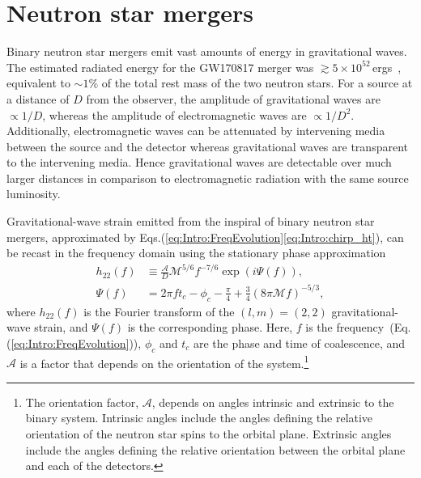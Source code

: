\documentclass[../Thesis.tex]{subfiles}
\begin{document}
    \section{Neutron star mergers} \label{sec:Intro:NeutronStarMergers}
    Binary neutron star mergers emit vast amounts of energy in gravitational waves.
    The estimated radiated energy for the GW170817 merger was $\gtrsim 5\times 10^{52}\,$ergs~\cite{GW170817Detection}, equivalent to $\sim 1\%$ of the total rest mass of the two neutron stars.
    For a source at a distance of $D$ from the observer, the amplitude of gravitational waves are  $\propto 1/D$, whereas the amplitude of electromagnetic waves are $\propto 1/D^2$.
    Additionally, electromagnetic waves can be attenuated by intervening media between the source and the detector whereas gravitational waves are transparent to the intervening media.
    Hence gravitational waves are detectable over much larger distances in comparison to electromagnetic radiation with the same source luminosity. \par
    Gravitational-wave strain emitted from the inspiral of binary neutron star mergers, approximated by Eqs.(\ref{eq:Intro:FreqEvolution}\Hyphdash*\ref{eq:Intro:chirp_ht}), can be recast in the frequency domain using the stationary phase approximation~\cite{Cutler1994}
    \begin{align}
        h_{22}(f) & \equiv \frac{\mathcal{A}}{D}\mathcal{M}^{5/6}f^{-7/6} \exp(i\Psi(f)), \label{eq:Intro:StationaryPhaseApproxH22} \\
        \Psi(f) & = 2\pi f t_c - \phi_c - \frac{\pi}{4} +\frac{3}{4}\left(8\pi\mathcal{M}f\right)^{-5/3}, \label{eq:Intro:StationaryPhaseApproxPsi} 
    \end{align}
    where $h_{22}(f)$ is the Fourier transform of the $(l,m)=(2,2)$ gravitational-wave strain, and $\Psi(f)$ is the corresponding phase.
    Here, $f$ is the frequency~(Eq.(\ref{eq:Intro:FreqEvolution})), $\phi_c$ and $t_c$ are the phase and time of coalescence, and $\mathcal{A}$ is a factor that depends on the orientation of the system.\footnote{The orientation factor, $\mathcal{A}$, depends on angles intrinsic and extrinsic to the binary system. Intrinsic angles include the angles defining the relative orientation of the neutron star spins to the orbital plane. Extrinsic angles include the angles defining the relative orientation between the orbital plane and each of the detectors.}
\end{document}
